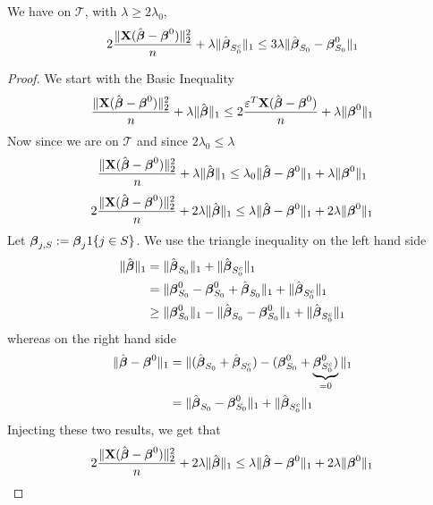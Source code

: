 \begin{lemma}[Lemma 6.3.]
    We have on $\mathscr{T}$, with $\lambda \geq 2 \lambda_{0}$,
    \begin{equation}
        \label{eqn: lemma 6.3.}
        2\frac{ \|\mathbf{X} (\hat{\boldsymbol{\beta}}-\boldsymbol{\beta}^{0} ) \|_{2}^{2}}{n} + \lambda \|\hat{\boldsymbol{\beta}}_{S_{0}^{c}} \|_{1} \leq 3 \lambda \|\hat{\boldsymbol{\beta}}_{S_{0}}-\boldsymbol{\beta}_{S_{0}}^{0} \|_{1}
    \end{equation}
\end{lemma}
\begin{proof}
    We start with the Basic Inequality
    $$
        \frac{\| \mathbf{X} (\hat{\boldsymbol{\beta}}-\boldsymbol{\beta}^{0})\|_{2}^{2}}{n} + \lambda\|\hat{\boldsymbol{\beta}}\|_{1} \leq 2 \frac{\varepsilon^{T} \mathbf{X} (\hat{\boldsymbol{\beta}}-\boldsymbol{\beta}^{0})}{n}+\lambda\|\boldsymbol{\beta}^{0}\|_{1}
    $$
    Now since we are on $\mathscr{T}$ and since $2 \lambda_0 \leq \lambda$
    $$
        \frac{\| \mathbf{X} (\hat{\boldsymbol{\beta}}-\boldsymbol{\beta}^{0})\|_{2}^{2}}{n} + \lambda\|\hat{\boldsymbol{\beta}}\|_{1} \leq \lambda_0 \|\hat{\boldsymbol{\beta}}-\boldsymbol{\beta}^{0}\|_1 + \lambda\|\boldsymbol{\beta}^{0}\|_{1}
    $$
    $$
        2 \frac{\| \mathbf{X} (\hat{\boldsymbol{\beta}}-\boldsymbol{\beta}^{0})\|_{2}^{2}}{n}+2 \lambda\|\hat{\boldsymbol{\beta}}\|_{1} \leq \lambda \|\hat{\boldsymbol{\beta}}-\boldsymbol{\beta}^{0} \|_{1}+2 \lambda \|\boldsymbol{\beta}^{0} \|_{1}
    $$
    Let $\boldsymbol{\beta}_{j, S}:=\boldsymbol{\beta}_{j} 1\{j \in S\}$. We use the triangle inequality on the left hand side
    \begin{align*}
        \|\hat{\boldsymbol{\beta}}\|_{1}
         & = \|\hat{\boldsymbol{\beta}}_{S_{0}} \|_{1} + \|\hat{\boldsymbol{\beta}}_{S_{0}^{c}} \|_{1}                                                \\
         & = \|\boldsymbol{\beta}_{S_{0}}^{0} - \boldsymbol{\beta}_{S_{0}}^{0} + \hat{\boldsymbol{\beta}}_{S_{0}} \|_{1} + \|\hat{\boldsymbol{\beta}}_{S_{0}^{c}} \|_{1}          \\
         & \geq \|\boldsymbol{\beta}_{S_{0}}^{0} \|_{1} - \|\hat{\boldsymbol{\beta}}_{S_{0}}-\boldsymbol{\beta}_{S_{0}}^{0} \|_{1}+ \|\hat{\boldsymbol{\beta}}_{S_{0}^{c}} \|_{1}
    \end{align*}
    whereas on the right hand side
    \begin{align*}
        \|\hat{\boldsymbol{\beta}}-\boldsymbol{\beta}^{0} \|_{1}
         & =  \| (\hat{\boldsymbol{\beta}}_{S_{0}} + \hat{\boldsymbol{\beta}}_{S_{0}^{c}}) - (\boldsymbol{\beta}_{S_{0}}^{0} + \underbrace{\boldsymbol{\beta}_{S_{0}^{c}}^0)}_{=0} \|_{1} \\
         & =  \| \hat{\boldsymbol{\beta}}_{S_{0}}-\boldsymbol{\beta}_{S_{0}}^{0} \|_{1} + \|\hat{\boldsymbol{\beta}}_{S_{0}^{c}} \|_{1}
    \end{align*}
    Injecting these two results, we get that
    \begin{align*}
                 & 2 \frac{\| \X (\hat{\bta}-\bta^{0})\|_{2}^{2}}{n} + 2 \lambda\|\hat{\bta}\|_{1} \leq \lambda \|\hat{\bta}-\bta^{0} \|_{1}+2 \lambda \|\bta^{0} \|_{1}                                                                                                \\

\end{align*}
\end{proof}
